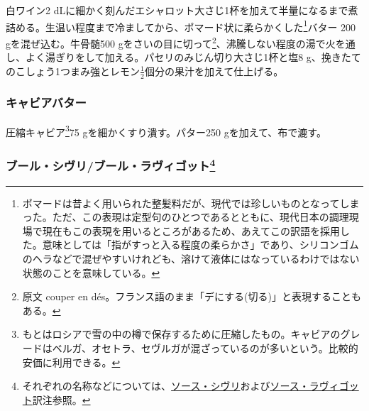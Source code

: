 \begin{recette}
白ワイン2
dLに細かく刻んだエシャロット大さじ1杯を加えて半量になるまで煮詰める。生温い程度まで冷ましてから、ポマード状に柔らかくした\footnote{ポマードは昔よく用いられた整髪料だが、現代では珍しいものとなってしまった。ただ、この表現は定型句のひとつであるとともに、現代日本の調理現場で現在もこの表現を用いるところがあるため、あえてこの訳語を採用した。意味としては「指がすっと入る程度の柔らかさ」であり、シリコンゴムのヘラなどで混ぜやすいけれども、溶けて液体にはなっているわけではない状態のことを意味している。}バター
200 gを混ぜ込む。牛骨髄500 gをさいの目に切って\footnote{原文 couper en
  dés。フランス語のまま「デにする(切る)」と表現することもある。}、沸騰しない程度の湯で火を通し、よく湯ぎりをして加える。パセリのみじん切り大さじ1杯と塩8
g、挽きたてのこしょう1つまみ強とレモン\(\frac{1}{2}\)個分の果汁を加えて仕上げる。

\hypertarget{beurre-de-caviar}{%
\subsubsection{キャビアバター}\label{beurre-de-caviar}}



圧縮キャビア\footnote{もとはロシアで雪の中の樽で保存するために圧縮したもの。キャビアのグレードはベルガ、オセトラ、セヴルガが混ざっているのが多いという。比較的安価に利用できる。}75
gを細かくすり潰す。パター250 gを加えて、布で漉す。

\hypertarget{beurre-chivry}{%
\subsubsection[ブール・シヴリ/ブール・ラヴィゴット]{\texorpdfstring{ブール・シヴリ/ブール・ラヴィゴット\footnote{それぞれの名称などについては、\protect\hyperlink{sacue-chivry}{ソース・シヴリ}および\protect\hyperlink{sauce-ravigote}{ソース・ラヴィゴット}訳注参照。}}{ブール・シヴリ/ブール・ラヴィゴット}}\label{beurre-chivry}}




\end{recette}
